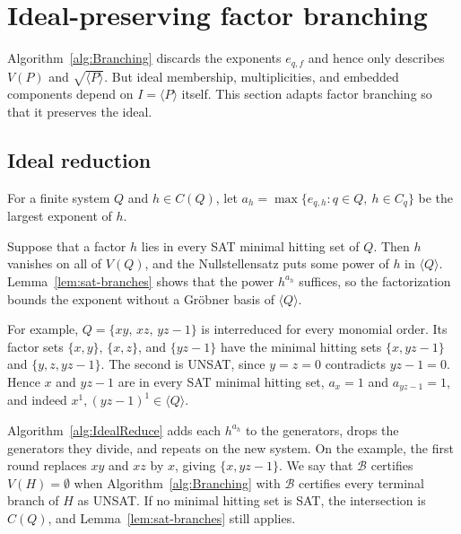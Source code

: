 \section{Ideal-preserving factor branching}
\label{sec:ideal-branching}

Algorithm~\ref{alg:Branching} discards the exponents $e_{q,f}$ and hence only
describes $V(P)$ and $\sqrt{\langle P\rangle}$. But ideal membership,
multiplicities, and embedded components depend on $I=\langle P\rangle$ itself.
This section adapts factor branching so that it preserves the ideal.

\subsection{Ideal reduction}
\label{subsec:sat-reduction}

For a finite system $Q$ and $h\in C(Q)$, let $a_h=\max\{e_{q,h}:q\in Q,\ h\in C_q\}$ be
the largest exponent of $h$.

Suppose that a factor $h$ lies in every SAT minimal hitting set of $Q$. Then
$h$ vanishes on all of $V(Q)$, and the Nullstellensatz puts some power of $h$
in $\langle Q\rangle$. Lemma~\ref{lem:sat-branches} shows that the power
$h^{a_h}$ suffices, so the factorization bounds the exponent without a
Gr\"obner basis of $\langle Q\rangle$.

For example, $Q=\{xy,\,xz,\,yz-1\}$ is interreduced for every monomial order.
Its factor sets $\{x,y\}$, $\{x,z\}$, and $\{yz-1\}$ have the minimal hitting
sets $\{x,yz-1\}$ and $\{y,z,yz-1\}$. The second is UNSAT, since $y=z=0$
contradicts $yz-1=0$. Hence $x$ and $yz-1$ are in every SAT minimal hitting
set, $a_x = 1$ and $a_{yz-1} = 1$, and indeed $x^1,
(yz-1)^1\in\langle Q\rangle$.

Algorithm~\ref{alg:IdealReduce} adds each $h^{a_h}$ to the generators, drops
the generators they divide, and repeats on the new system. On the example,
the first round replaces $xy$ and $xz$ by $x$, giving $\{x,yz-1\}$. We say
that $\mathcal B$ certifies $V(H)=\emptyset$ when Algorithm~\ref{alg:Branching}
with $\mathcal B$ certifies every terminal branch of $H$ as UNSAT. If no
minimal hitting set is SAT, the intersection is $C(Q)$, and
Lemma~\ref{lem:sat-branches} still applies.

